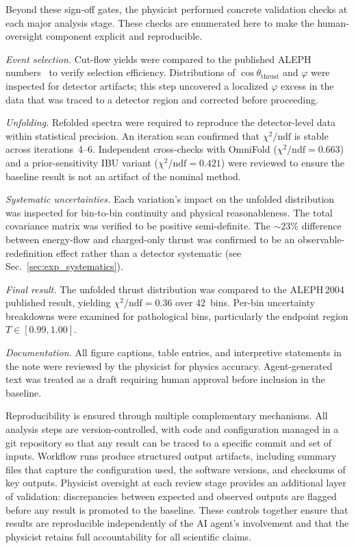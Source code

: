 Beyond these sign-off gates, the physicist performed concrete validation checks at each major analysis stage. These checks are enumerated here to make the human-oversight component explicit and reproducible.

\textit{Event selection.}
Cut-flow yields were compared to the published ALEPH numbers~\cite{Heister:2003aj} to verify selection efficiency.
Distributions of $\cos\theta_{\mathrm{thrust}}$ and $\varphi$ were inspected for detector artifacts; this step uncovered a localized $\varphi$ excess in the data that was traced to a detector region and corrected before proceeding.

\textit{Unfolding.}
Refolded spectra were required to reproduce the detector-level data within statistical precision.
An iteration scan confirmed that $\chi^{2}/\mathrm{ndf}$ is stable across iterations~4--6.
Independent cross-checks with OmniFold ($\chi^{2}/\mathrm{ndf}=0.663$) and a prior-sensitivity IBU variant ($\chi^{2}/\mathrm{ndf}=0.421$) were reviewed to ensure the baseline result is not an artifact of the nominal method.

\textit{Systematic uncertainties.}
Each variation's impact on the unfolded distribution was inspected for bin-to-bin continuity and physical reasonableness.
The total covariance matrix was verified to be positive semi-definite.
The ${\sim}23\%$ difference between energy-flow and charged-only thrust was confirmed to be an observable-redefinition effect rather than a detector systematic (see Sec.~\ref{sec:exp_systematics}).

\textit{Final result.}
The unfolded thrust distribution was compared to the ALEPH\,2004 published result, yielding $\chi^{2}/\mathrm{ndf}=0.36$ over 42~bins.
Per-bin uncertainty breakdowns were examined for pathological bins, particularly the endpoint region $T\in[0.99,1.00]$.

\textit{Documentation.}
All figure captions, table entries, and interpretive statements in the note were reviewed by the physicist for physics accuracy.
Agent-generated text was treated as a draft requiring human approval before inclusion in the baseline.

Reproducibility is ensured through multiple complementary mechanisms. All
analysis steps are version-controlled, with code and configuration managed
in a git repository so that any result can be traced to a specific commit
and set of inputs. Workflow runs produce structured output artifacts,
including summary files that capture the configuration used, the software
versions, and checksums of key outputs. Physicist oversight at each review
stage provides an additional layer of validation: discrepancies between
expected and observed outputs are flagged before any result is promoted to
the baseline. These controls together ensure that results are reproducible
independently of the AI agent's involvement and that the physicist retains
full accountability for all scientific claims.

